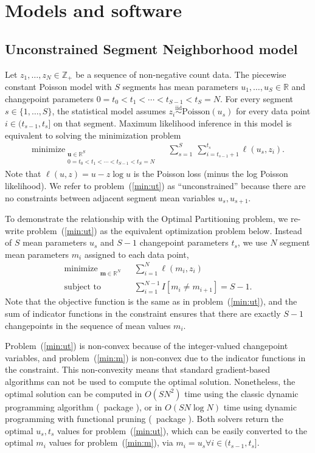 \documentclass[article]{jss}
\newcommand{\R}{\proglang{R}}
\DeclareMathOperator*{\minimize}{minimize}
\newcommand{\ZZ}{\mathbb Z}
\newcommand{\RR}{\mathbb R}
\begin{document}
\section{Models and software} \label{sec:models}

\subsection{Unconstrained Segment Neighborhood model}

Let $z_1,\dots,z_N\in\ZZ_+$ be a sequence of non-negative count
data. The piecewise constant Poisson model with $S$ segments has mean
parameters $u_1,\dots,u_S\in\RR$ and changepoint parameters
$0=t_0<t_1<\cdots<t_{S-1}<t_S=N$. For every segment
$s\in\{1,\dots,S\}$, the statistical model assumes
$z_i \stackrel{\text{iid}}{\sim} \text{Poisson}(u_s)$ for every data
point $i\in(t_{s-1},t_s]$ on that segment. Maximum likelihood
inference in this model is equivalent to solving the minimization
problem
\begin{align}
    \minimize_{\substack{
  \mathbf u\in\RR^{S}
\\
   0=t_0<t_1<\cdots<t_{S-1}<t_S=N
  }} &\ \ 
    \sum_{s=1}^S\  \sum_{i=t_{s-1}+1}^{t_s} \ell(u_s,z_i).
\label{min:ut}
\end{align}
Note that $\ell(u, z)=u-z\log u$ is the Poisson loss (minus the log
Poisson likelihood). We refer to problem~(\ref{min:ut}) as
``unconstrained'' because there are no constraints between adjacent
segment mean variables $u_s,u_{s+1}$.

To demonstrate the relationship with the Optimal Partitioning problem,
we re-write problem~(\ref{min:ut}) as the equivalent optimization
problem below. Instead of $S$ mean parameters $u_s$ and $S-1$
changepoint parameters $t_s$, we use $N$ segment mean
parameters $m_i$ assigned to each data point,
\begin{align}
    \minimize_{\substack{
  \mathbf m\in\RR^{N}
  }} &\ \ 
    \sum_{i=1}^N \ell(m_i, z_i)
\label{min:m}
\\
      \text{subject to} &\ \ \sum_{i=1}^{N-1} I[m_i\neq m_{i+1}]=S-1.
  \nonumber
\end{align}
Note that the objective function is the same as in
problem~(\ref{min:ut}), and the sum of indicator functions in the
constraint ensures that there are exactly $S-1$ changepoints in the
sequence of mean values $m_i$.

Problem~(\ref{min:ut}) is non-convex because of the integer-valued
changepoint variables, and problem~(\ref{min:m}) is non-convex due to
the indicator functions in the constraint. This non-convexity means
that standard gradient-based algorithms can not be used to compute the
optimal solution. Nonetheless, the optimal solution can be computed in
$O(SN^2)$ time using the classic dynamic programming algorithm (\R\
package ), or in $O(SN\log N)$ time using dynamic
programming with functional pruning (\R\ package \pkg{jointseg}). Both
solvers return the optimal $u_s,t_s$ values for
problem~(\ref{min:ut}), which can be easily converted to the optimal
$m_i$ values for problem~(\ref{min:m}), via
$m_i=u_s \forall i\in (t_{s-1},t_s]$.
\end{document}
